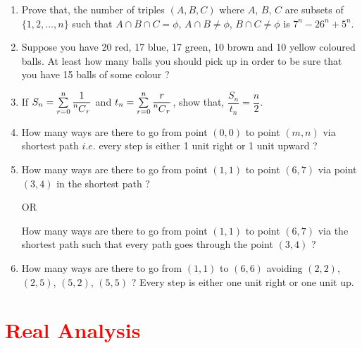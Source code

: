 \documentclass[11pt, a4paper]{article}
\newcommand\mycomb[2][^n]{\prescript{#1\mkern-0.5mu}{}C_{#2}}
\begin{document}
\begin{enumerate}
	\item Prove that, the number of triples $(A, B, C)$ where $A$, $B$, $C$ are subsets of $\{1, 2, \ldots, n\}$ such that $A \cap B \cap C = \phi$, $A \cap B \neq \phi$, $B \cap C \neq \phi$ is $7^n - 2 6^n + 5^n$.
	
	\item Suppose you have 20 red, 17 blue, 17 green, 10 brown and 10 yellow coloured balls. At least how many balls you should pick up in order to be sure that you have 15 balls of some colour ?
	
	\item If $S_n = \sum \limits_{r = 0}^{n} \dfrac{1}{\mycomb[n]{r}}$ and $t_n = \sum \limits_{r = 0}^{n} \dfrac{r}{\mycomb[n]{r}}$, show that, $\dfrac{S_n}{t_n} = \dfrac{n}{2}$.
	
	\item How many ways are there to go from point $(0, 0)$ to point $(m, n)$ via shortest path $i.e.$ every step is either 1 unit right or 1 unit upward ?
	
	\item How many ways are there to go from point $(1, 1)$ to  point $(6, 7)$ via point $(3, 4)$ in the shortest path ?
	\begin{center}
	OR
	\end{center}
	How many ways are there to go from point $(1, 1)$ to point $(6, 7)$ via the shortest path such that every path goes through the point $(3, 4)$ ?
	
	\item How many ways are there to go from $(1, 1)$ to $(6, 6)$ avoiding $(2, 2)$, $(2, 5)$, $(5, 2)$, $(5, 5)$ ? Every step is either one unit right or one unit up.
\end{enumerate}





\section{\textcolor{red}{Real Analysis}}
\end{document}
